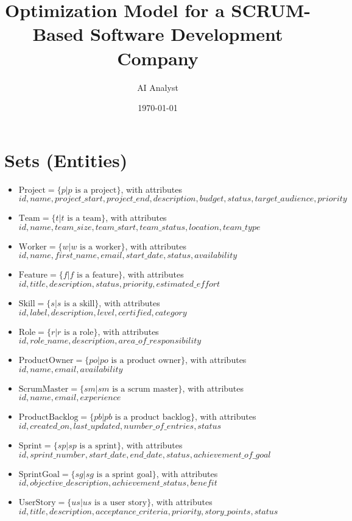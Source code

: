 \documentclass[11pt]{article}
\title{Optimization Model for a SCRUM-Based Software Development Company}
\author{AI Analyst}
\date{\today}
\begin{document}
\maketitle
\tableofcontents
\newpage

\section{Sets (Entities)}
\begin{itemize}
    \item $\text{Project} = \{p | p \text{ is a project}\}$, with attributes $id, name, project\_start, project\_end, description, budget, status, target\_audience, priority$
    \item $\text{Team} = \{t | t \text{ is a team}\}$, with attributes $id, name, team\_size, team\_start, team\_status, location, team\_type$
    \item $\text{Worker} = \{w | w \text{ is a worker}\}$, with attributes $id, name, first\_name, email, start\_date, status, availability$
    \item $\text{Feature} = \{f | f \text{ is a feature}\}$, with attributes $id, title, description, status, priority, estimated\_effort$
    \item $\text{Skill} = \{s | s \text{ is a skill}\}$, with attributes $id, label, description, level, certified, category$
    \item $\text{Role} = \{r | r \text{ is a role}\}$, with attributes $id, role\_name, description, area\_of\_responsibility$
    \item $\text{ProductOwner} = \{po | po \text{ is a product owner}\}$, with attributes $id, name, email, availability$
    \item $\text{ScrumMaster} = \{sm | sm \text{ is a scrum master}\}$, with attributes $id, name, email, experience$
    \item $\text{ProductBacklog} = \{pb | pb \text{ is a product backlog}\}$, with attributes $id, created\_on, last\_updated, number\_of\_entries, status$
    \item $\text{Sprint} = \{sp | sp \text{ is a sprint}\}$, with attributes $id, sprint\_number, start\_date, end\_date, status, achievement\_of\_goal$
    \item $\text{SprintGoal} = \{sg | sg \text{ is a sprint goal}\}$, with attributes $id, objective\_description, achievement\_status, benefit$
    \item $\text{UserStory} = \{us | us \text{ is a user story}\}$, with attributes $id, title, description, acceptance\_criteria, priority, story\_points, status$

\end{itemize}
\end{document}
